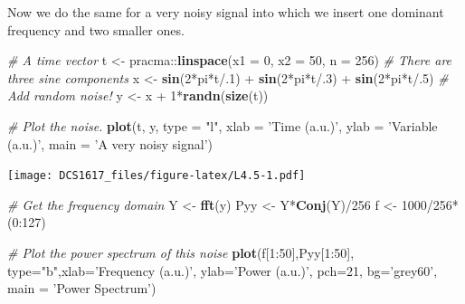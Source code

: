 \documentclass[]{book}
\newenvironment{Shaded}{\begin{snugshade}}{\end{snugshade}}
\newcommand{\KeywordTok}[1]{\textcolor[rgb]{0.13,0.29,0.53}{\textbf{{#1}}}}
\newcommand{\DataTypeTok}[1]{\textcolor[rgb]{0.13,0.29,0.53}{{#1}}}
\newcommand{\DecValTok}[1]{\textcolor[rgb]{0.00,0.00,0.81}{{#1}}}
\newcommand{\StringTok}[1]{\textcolor[rgb]{0.31,0.60,0.02}{{#1}}}
\newcommand{\CommentTok}[1]{\textcolor[rgb]{0.56,0.35,0.01}{\textit{{#1}}}}
\newcommand{\NormalTok}[1]{{#1}}
\begin{document}
Now we do the same for a very noisy signal into which we insert one
dominant frequency and two smaller ones.

\begin{Shaded}
\begin{Highlighting}[]
\CommentTok{# A time vector}
\NormalTok{t <-}\StringTok{ }\NormalTok{pracma::}\KeywordTok{linspace}\NormalTok{(}\DataTypeTok{x1 =} \DecValTok{0}\NormalTok{, }\DataTypeTok{x2 =} \DecValTok{50}\NormalTok{, }\DataTypeTok{n =} \DecValTok{256}\NormalTok{)}
\CommentTok{# There are three sine components}
\NormalTok{x <-}\StringTok{ }\KeywordTok{sin}\NormalTok{(}\DecValTok{2}\NormalTok{*pi*t/.}\DecValTok{1}\NormalTok{) +}\StringTok{ }\KeywordTok{sin}\NormalTok{(}\DecValTok{2}\NormalTok{*pi*t/.}\DecValTok{3}\NormalTok{) +}\StringTok{ }\KeywordTok{sin}\NormalTok{(}\DecValTok{2}\NormalTok{*pi*t/.}\DecValTok{5}\NormalTok{)}
\CommentTok{# Add random noise!}
\NormalTok{y <-}\StringTok{ }\NormalTok{x +}\StringTok{ }\DecValTok{1}\NormalTok{*}\KeywordTok{randn}\NormalTok{(}\KeywordTok{size}\NormalTok{(t))}

\CommentTok{# Plot the noise.}
\KeywordTok{plot}\NormalTok{(t, y, }\DataTypeTok{type =} \StringTok{"l"}\NormalTok{, }\DataTypeTok{xlab =} \StringTok{'Time (a.u.)'}\NormalTok{, }\DataTypeTok{ylab =} \StringTok{'Variable (a.u.)'}\NormalTok{, }\DataTypeTok{main =} \StringTok{'A very noisy signal'}\NormalTok{)}
\end{Highlighting}
\end{Shaded}

\texttt{[image: DCS1617\_files/figure-latex/L4.5-1.pdf]}

\begin{Shaded}
\begin{Highlighting}[]
\CommentTok{# Get the frequency domain}
\NormalTok{Y <-}\StringTok{ }\KeywordTok{fft}\NormalTok{(y)}
\NormalTok{Pyy <-}\StringTok{ }\NormalTok{Y*}\KeywordTok{Conj}\NormalTok{(Y)/}\DecValTok{256}
\NormalTok{f <-}\StringTok{ }\DecValTok{1000}\NormalTok{/}\DecValTok{256}\NormalTok{*(}\DecValTok{0}\NormalTok{:}\DecValTok{127}\NormalTok{)}

\CommentTok{# Plot the power spectrum of this noise}
\KeywordTok{plot}\NormalTok{(f[}\DecValTok{1}\NormalTok{:}\DecValTok{50}\NormalTok{],Pyy[}\DecValTok{1}\NormalTok{:}\DecValTok{50}\NormalTok{], }\DataTypeTok{type=}\StringTok{"b"}\NormalTok{,}\DataTypeTok{xlab=}\StringTok{'Frequency (a.u.)'}\NormalTok{, }\DataTypeTok{ylab=}\StringTok{'Power (a.u.)'}\NormalTok{, }\DataTypeTok{pch=}\DecValTok{21}\NormalTok{, }\DataTypeTok{bg=}\StringTok{'grey60'}\NormalTok{, }\DataTypeTok{main =} \StringTok{'Power Spectrum'}\NormalTok{)}
\end{Highlighting}
\end{Shaded}
\end{document}
